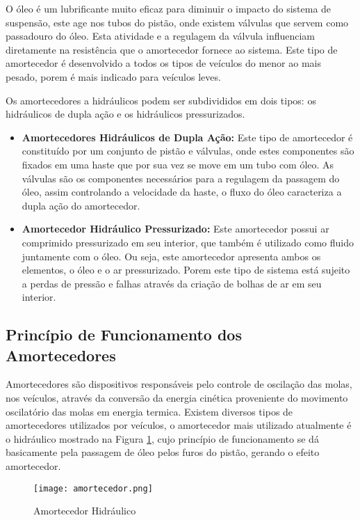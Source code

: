 			O óleo é um lubrificante muito eficaz para diminuir o impacto do sistema de suspensão, este age nos tubos do pistão, onde existem válvulas que servem como passadouro do óleo. Esta atividade e a regulagem da válvula influenciam diretamente na resistência que o amortecedor fornece ao sistema. Este tipo de amortecedor é desenvolvido a todos os tipos de veículos do menor ao mais pesado, porem é mais indicado para veículos leves.

			Os amortecedores a hidráulicos podem ser subdivididos em dois tipos: os hidráulicos de dupla ação e os hidráulicos pressurizados.


			\begin{itemize}
			
				\item \textbf{Amortecedores Hidráulicos de Dupla Ação:} Este tipo de amortecedor é constituído por um conjunto de pistão e válvulas, onde estes componentes são fixados em uma haste que por sua vez se move em um tubo com óleo. As válvulas são os componentes necessários para a regulagem da passagem do óleo, assim controlando a velocidade da haste, o fluxo do óleo caracteriza a dupla ação do amortecedor.

				\item \textbf{Amortecedor Hidráulico Pressurizado:} Este amortecedor possui ar comprimido pressurizado em seu interior, que também é utilizado como fluido juntamente com o óleo. Ou seja, este amortecedor apresenta ambos os elementos, o óleo e o ar pressurizado. Porem este tipo de sistema está sujeito a perdas de pressão e falhas através da criação de bolhas de ar em seu interior.

			\end{itemize}

		\subsection{Princípio de Funcionamento dos Amortecedores}

			Amortecedores são dispositivos responsáveis pelo controle de oscilação das molas, nos veículos, através da conversão da energia cinética proveniente do movimento oscilatório das molas em energia termica. Existem diversos tipos de amortecedores utilizados por veículos, o amortecedor mais utilizado atualmente é o hidráulico mostrado na Figura \ref{amortecedor}, cujo princípio de funcionamento se dá basicamente pela passagem de óleo pelos furos do pistão, gerando o efeito amortecedor.

			\newpage
			\begin{figure}[!h]
				\centering
				\texttt{[image: amortecedor.png]}
				\caption[Amortecedor Hidráulico]{Amortecedor Hidráulico \cite{Duarte}}
				\label{amortecedor}
			\end{figure}

